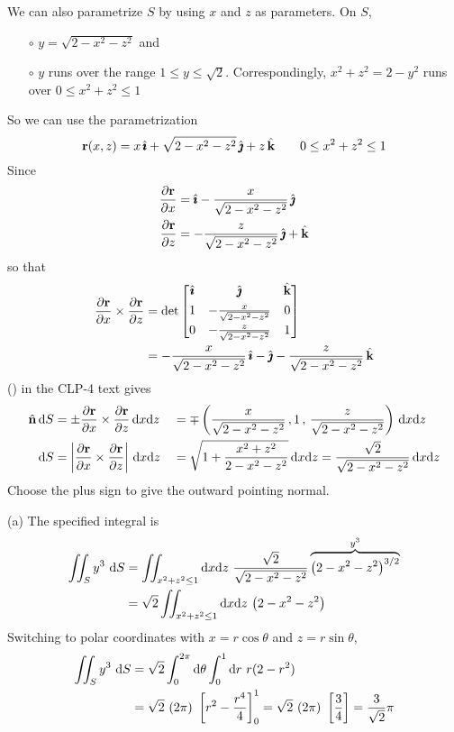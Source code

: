 \begin{solution}
We can also parametrize $S$ by using $x$ and $z$ as parameters.
On $S$, 
\begin{itemize}\itemsep1pt \parskip0pt  %
\item[$\circ$]
$y=\sqrt{2-x^2-z^2}$ and
\item[$\circ$]
$y$ runs over the range $1\le y\le\sqrt{2}$. Correspondingly,
$x^2+z^2=2-y^2$ runs over $0\le x^2+z^2\le 1$
\end{itemize}
So we can use the parametrization
\begin{equation*}
\mathbf{r}(x,z) = x\,\hat{\pmb{\imath}} +\sqrt{2-x^2-z^2}\,\hat{\pmb{\jmath}} +z\,\hat{\mathbf{k}}\qquad
0\le x^2+z^2\le 1
\end{equation*}
Since
\begin{align*}
\frac{\partial\mathbf{r}}{\partial x}
&= \hat{\pmb{\imath}} -\frac{x}{\sqrt{2-x^2-z^2}}\,\hat{\pmb{\jmath}} \\
\frac{\partial\mathbf{r}}{\partial z}
&= -\frac{z}{\sqrt{2-x^2-z^2}}\,\hat{\pmb{\jmath}}  + \hat{\mathbf{k}}
\end{align*}
so that
\begin{align*}
\frac{\partial\mathbf{r}}{\partial x}\times\frac{\partial\mathbf{r}}{\partial z}
&= \det\left[\begin{matrix} \hat{\pmb{\imath}} & \hat{\pmb{\jmath}} & \hat{\mathbf{k}} \\[0.05in]
1 & -\frac{x}{\sqrt{2-x^2-z^2}}  &  0 \\[0.05in]
0 & -\frac{z}{\sqrt{2-x^2-z^2}} & 1  \end{matrix}\right] \\
&= -\frac{x}{\sqrt{2-x^2-z^2}}\,\hat{\pmb{\imath}} - \hat{\pmb{\jmath}} 
             -\frac{z}{\sqrt{2-x^2-z^2}}\,\hat{\mathbf{k}}
\end{align*}
() in the CLP-4 text gives
\begin{alignat*}{3}
\hat{\mathbf{n}}\,\mathrm{d}S &= \pm \frac{\partial\mathbf{r}}{\partial x}\times
            \frac{\partial\mathbf{r}}{\partial z}\,\mathrm{d}x\mathrm{d}z
&&= \mp
   \left(\frac{x}{\sqrt{2-x^2-z^2}}\,,1\,,\, \frac{z}{\sqrt{2-x^2-z^2}}\right)
          \,\mathrm{d}x\mathrm{d}z \\
\mathrm{d}S &= \left|\frac{\partial\mathbf{r}}{\partial x}\times
       \frac{\partial\mathbf{r}}{\partial z}\right|\,\mathrm{d}x\mathrm{d}z
&&= \sqrt{1+\frac{x^2+z^2}{2-x^2-z^2}}\,\mathrm{d}x\mathrm{d}z
    =\frac{\sqrt{2}}{\sqrt{2-x^2-z^2}}\,\mathrm{d}x\mathrm{d}z
\end{alignat*}
Choose the plus sign to give the outward pointing normal.

(a)
The specified integral is
\begin{align*}
\dblInt_S y^3\ \dee{S}
&=\dblInt_{x^2+z^2\le 1}\dee{x}\dee{z}\ \frac{\sqrt{2}}{\sqrt{2-x^2-z^2}}
          \overbrace{\big(2-x^2-z^2\big)^{3/2}}^{y^3} \\
&=\sqrt{2}\dblInt_{x^2+z^2\le 1}\dee{x}\dee{z}\ \big(2-x^2-z^2\big)
\end{align*}
Switching to polar coordinates with $x=r\cos\theta$ and $z=r\sin\theta$,
\begin{align*}
\iint_S y^3\ \mathrm{d}S
&= \sqrt{2}\int_0^{2\pi}\mathrm{d}\theta\int_0^1\mathrm{d}r\ r(2-r^2) \\
&= \sqrt{2}\ (2\pi)\ \left[r^2-\frac{r^4}{4}\right]_0^1
= \sqrt{2}\ (2\pi)\ \left[\frac{3}{4}\right]
=\frac{3}{\sqrt{2}}\pi
\end{align*}


\end{solution}

